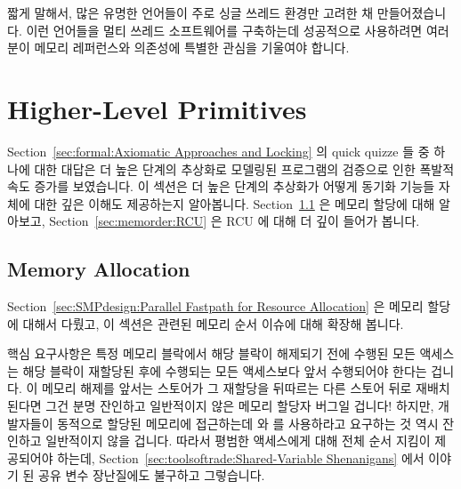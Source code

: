 짧게 말해서, 많은 유명한 언어들이 주로 싱글 쓰레드 환경만 고려한 채
만들어졌습니다.
이런 언어들을 멀티 쓰레드 소프트웨어를 구축하는데 성공적으로 사용하려면
여러분이 메모리 레퍼런스와 의존성에 특별한 관심을 기울여야 합니다.

\section{Higher-Level Primitives}
\label{sec:memorder:Higher-Level Primitives}

Section~\ref{sec:formal:Axiomatic Approaches and Locking}
의 quick quizze 들 중 하나에 대한 대답은 더 높은 단계의 추상화로 모델링된
프로그램의 검증으로 인한 폭발적 속도 증가를 보였습니다.
이 섹션은 더 높은 단계의 추상화가 어떻게 동기화 기능들 자체에 대한 깊은 이해도
제공하는지 알아봅니다.
Section~\ref{sec:memorder:Memory Allocation}
은 메모리 할당에 대해 알아보고,
Section~\ref{sec:memorder:RCU}
은 RCU 에 대해 더 깊이 들어가 봅니다.

\subsection{Memory Allocation}
\label{sec:memorder:Memory Allocation}

Section~\ref{sec:SMPdesign:Parallel Fastpath for Resource Allocation}
은 메모리 할당에 대해서 다뤘고, 이 섹션은 관련된 메모리 순서 이슈에 대해 확장해
봅니다.

핵심 요구사항은 특정 메모리 블락에서 해당 블락이 해제되기 전에 수행된 모든
액세스는 해당 블락이 재할당된 후에 수행되는 모든 액세스보다 앞서 수행되어야
한다는 겁니다.
이 메모리 해제를 앞서는 스토어가 그 재할당을 뒤따르는 다른 스토어 뒤로 재배치
된다면 그건 분명 잔인하고 일반적이지 않은 메모리 할당자 버그일 겁니다!
하지만, 개발자들이 동적으로 할당된 메모리에 접근하는데  와
 를 사용하라고 요구하는 것 역시 잔인하고 일반적이지 않을
겁니다.
따라서 평범한 액세스에게 대해 전체 순서 지킴이 제공되어야 하는데,
Section~\ref{sec:toolsoftrade:Shared-Variable Shenanigans} 에서 이야기 된 공유
변수 장난질에도 불구하고 그렇습니다.
\iffalse

